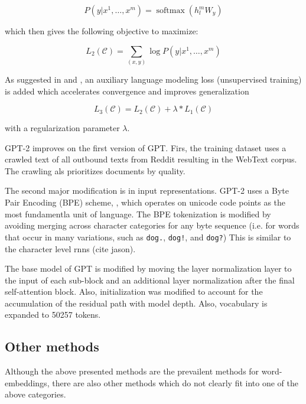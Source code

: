 \documentclass[a4paper,12pt,twoside,openright]{report}
\begin{document}
\begin{equation}
P\left(y | x^{1}, \ldots, x^{m}\right)=\operatorname{softmax}\left(h_{l}^{m} W_{y}\right)
\end{equation}

which then gives the following objective to maximize:

\begin{equation}
L_{2}(\mathcal{C})=\sum_{(x, y)} \log P\left(y | x^{1}, \ldots, x^{m}\right)
\end{equation}

As suggested in \cite{Rei17} and \cite{peters17}, an auxiliary language modeling loss (unsupervised training) is added which accelerates convergence and improves generalization

\begin{equation}
L_{3}(\mathcal{C})=L_{2}(\mathcal{C})+\lambda * L_{1}(\mathcal{C})
\end{equation}

with a regularization parameter $\lambda$.



GPT-2 improves on the first version of GPT.
Firs, the training dataset uses a crawled text of all outbound texts from Reddit resulting in the WebText corpus. 
The crawling als prioritizes documents by quality.

The second major modification is in input representations.
GPT-2 uses a Byte Pair Encoding (BPE) scheme,
\cite{sennrich15}, which operates on unicode code points as the most fundamentla unit of language.
The BPE tokenization is modified by avoiding merging across character categories for any byte sequence (i.e. for words that occur in many variations, such as \Verb#dog.#, \Verb#dog!#, and \Verb#dog?#)
This is similar to the character level rnns (cite jason).

The base model of GPT is modified by moving the layer normalization \cite{ba16} layer to the input of each sub-block and an additional layer normalization after the final self-attention block. 
Also, initialization was modified to account for the accumulation of the residual path with model depth.
Also, vocabulary is expanded to 50257 tokens.


\subsection{Other methods}

Although the above presented methods are the prevailent methods for word-embeddings, there are also other methods which do not clearly fit into one of the above categories.
\end{document}
